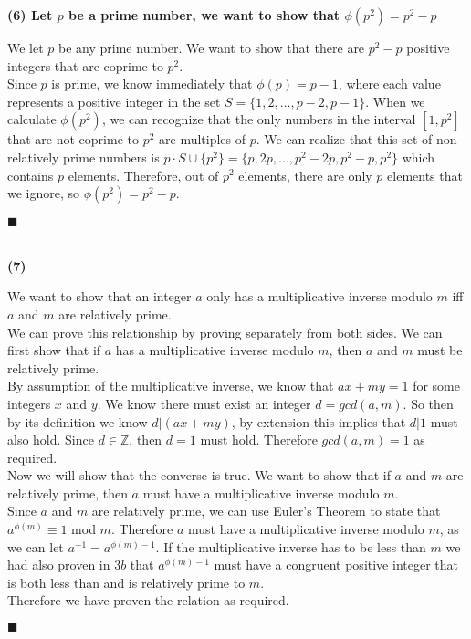 \documentclass[20pt]{article}
\begin{document}
\newpage

\noindent
\textbf{(6) Let $p$ be a prime number, we want to show that $\phi(p^2) = p^2 - p$}\\
\begin{text}
    We let $p$ be any prime number. We want to show that there are $p^2 - p$ positive integers that are coprime to $p^2$.\\
    
    \noindent
    Since $p$ is prime, we know immediately that $\phi(p) = p - 1$, where each value represents a positive integer in the set $S = \{1, 2, ... , p - 2, p - 1\}$. When we calculate $\phi(p^2)$, we can recognize that the only numbers in the interval $[1, p^2]$ that are not coprime to $p^2$ are multiples of $p$. We can realize that this set of non-relatively prime numbers is $p \cdot S \cup \{p^2\} = \{p, 2p, ... , p^2 - 2p, p^2 - p, p^2\}$ which contains $p$ elements. Therefore, out of $p^2$ elements, there are only $p$ elements that we ignore, so $\phi(p^2) = p^2 - p$.
    
    \hfill $\blacksquare$
\end{text}\\

\noindent
\textbf{(7)}
\begin{text}
    We want to show that an integer $a$ only has a multiplicative inverse modulo $m$ iff $a$ and $m$ are relatively prime.\\
    
    \noindent
    We can prove this relationship by proving separately from both sides. We can first show that if $a$ has a multiplicative inverse modulo $m$, then $a$ and $m$ must be relatively prime.\\
    
    \noindent
    By assumption of the multiplicative inverse, we know that $ax + my = 1$ for some integers $x$ and $y$. We know there must exist an integer $d = gcd(a, m)$. So then by its definition we know $d |(ax + my)$, by extension this implies that $d|1$ must also hold. Since $d \in \mathbb{Z}$, then $d = 1$ must hold. Therefore $gcd(a, m) = 1$ as required.\\
    
    \noindent
    Now we will show that the converse is true. We want to show that if $a$ and $m$ are relatively prime, then $a$ must have a multiplicative inverse modulo $m$.\\
    
    \noindent
    Since $a$ and $m$ are relatively prime, we can use Euler's Theorem to state that $a^{\phi(m)} \equiv 1$ mod $m$. Therefore $a$ must have a multiplicative inverse modulo $m$, as we can let $a^{-1} = a^{\phi(m) - 1}$. If the multiplicative inverse has to be less than $m$ we had also proven in $3b$ that $a^{\phi(m) - 1}$ must have a congruent positive integer that is both less than and is relatively prime to $m$.\\
    
    \noindent
    Therefore we have proven the relation as required.
    
    \hfill $\blacksquare$
\end{text}\\
\end{document}
